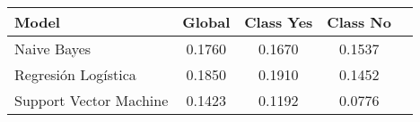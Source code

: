 \begin{tabular}{p{3cm}|c|c|c|c}
\toprule
                  Model &  Global &  Class Yes &  Class No \\
\midrule
            Naive Bayes &  0.1760 &     0.1670 &    0.1537 \\
    Regresión Logística &  0.1850 &     0.1910 &    0.1452 \\
 Support Vector Machine &  0.1423 &     0.1192 &    0.0776 \\
\bottomrule
\end{tabular}
